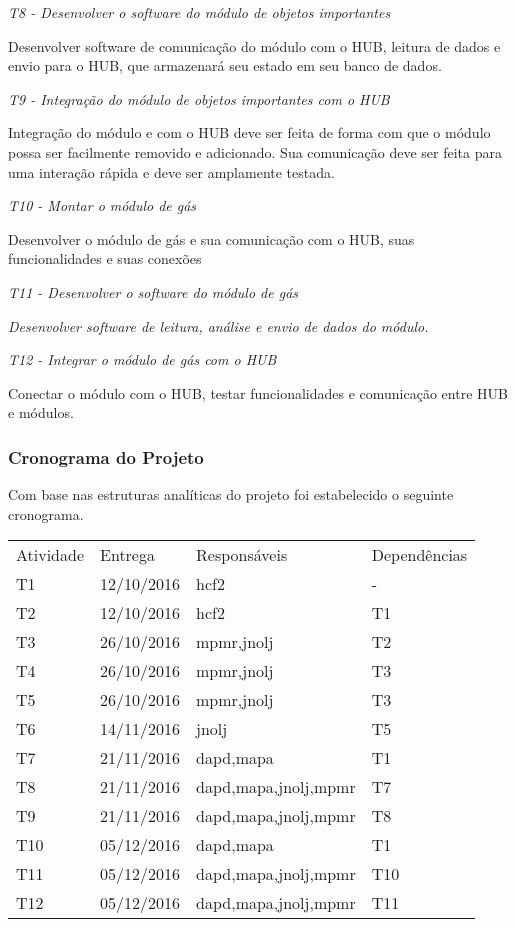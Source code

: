 {\itshape T8 -\/ Desenvolver o software do módulo de objetos importantes}

Desenvolver software de comunicação do módulo com o H\+UB, leitura de dados e envio para o H\+UB, que armazenará seu estado em seu banco de dados.

{\itshape T9 -\/ Integração do módulo de objetos importantes com o H\+UB}

Integração do módulo e com o H\+UB deve ser feita de forma com que o módulo possa ser facilmente removido e adicionado. Sua comunicação deve ser feita para uma interação rápida e deve ser amplamente testada.

{\itshape T10 -\/ Montar o módulo de gás}

Desenvolver o módulo de gás e sua comunicação com o H\+UB, suas funcionalidades e suas conexões

{\itshape T11 -\/ Desenvolver o software do módulo de gás}

{\itshape Desenvolver software de leitura, análise e envio de dados do módulo.}

{\itshape T12 -\/ Integrar o módulo de gás com o H\+UB}

Conectar o módulo com o H\+UB, testar funcionalidades e comunicação entre H\+UB e módulos.

\subsubsection*{Cronograma do Projeto }

Com base nas estruturas analíticas do projeto foi estabelecido o seguinte cronograma.

\tabulinesep=1mm
\begin{longtabu} spread 0pt [c]{*4{|X[-1]}|}
\hline
Atividade &Entrega &Responsáveis &Dependências  \\
T1 &12/10/2016 &hcf2 &-\/  \\
T2 &12/10/2016 &hcf2 &T1  \\
T3 &26/10/2016 &mpmr,jnolj &T2  \\
T4 &26/10/2016 &mpmr,jnolj &T3  \\
T5 &26/10/2016 &mpmr,jnolj &T3  \\
T6 &14/11/2016 &jnolj &T5  \\
T7 &21/11/2016 &dapd,mapa &T1  \\
T8 &21/11/2016 &dapd,mapa,jnolj,mpmr &T7  \\
T9 &21/11/2016 &dapd,mapa,jnolj,mpmr &T8  \\
T10 &05/12/2016 &dapd,mapa &T1  \\
T11 &05/12/2016 &dapd,mapa,jnolj,mpmr &T10  \\
T12 &05/12/2016 &dapd,mapa,jnolj,mpmr &T11  \\
\end{longtabu}


